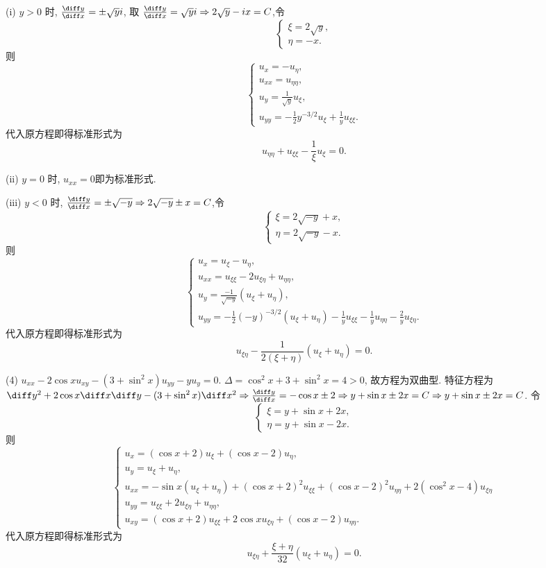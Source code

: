 \begin{solve}
  (i) $y>0$ 时, $\frac{\diff y}{\diff x}=\pm\sqrt{y}i$,
  取 $\frac{\diff y}{\diff x}=\sqrt{y}i\Rightarrow 2\sqrt{y}-ix=C$,令
  \[\begin{cases}
  \xi = 2\sqrt{y}, \\
  \eta=-x.
  \end{cases}\]
  则
  \[\begin{cases}
    u_x = -u_{\eta}, \\
    u_{xx} = u_{\eta\eta}, \\
    u_{y} = \frac{1}{\sqrt{y}}u_{\xi}, \\
    u_{yy} = -\frac{1}{2}y^{-3/2}u_{\xi}+\frac{1}{y}u_{\xi\xi}.
  \end{cases}\]
  代入原方程即得标准形式为
  \[u_{\eta\eta}+u_{\xi\xi}-\frac{1}{\xi}u_{\xi} = 0.\]

  (ii) $y=0$ 时, $u_{xx}=0$即为标准形式.

  (iii) $y<0$ 时, $\frac{\diff y}{\diff x}=\pm\sqrt{-y}\Rightarrow 2\sqrt{-y}\pm x=C$,令
  \[\begin{cases}
  \xi = 2\sqrt{-y}+x, \\
  \eta = 2\sqrt{-y}-x.
  \end{cases}\]
  则
  \[\begin{cases}
    u_x=u_{\xi}-u_{\eta}, \\
    u_{xx}=u_{\xi\xi}-2u_{\xi\eta}+u_{\eta\eta}, \\
    u_{y}=\frac{-1}{\sqrt{-y}}(u_{\xi}+u_{\eta}), \\
    u_{yy}=-\frac{1}{2}(-y)^{-3/2}(u_{\xi}+u_{\eta})-\frac{1}{y}u_{\xi\xi}-\frac{1}{y}u_{\eta\eta}-\frac{2}{y}u_{\xi\eta}.
  \end{cases}\]
  代入原方程即得标准形式为
  \[u_{\xi\eta}-\frac{1}{2(\xi+\eta)}(u_{\xi}+u_{\eta}) = 0.\]

  (4) $u_{xx}-2\cos xu_{xy}-(3+\sin^2x)u_{yy}-yu_y=0$.
  $\Delta=\cos^2x+3+\sin^2x=4>0$, 故方程为双曲型.
  特征方程为 $\diff y^2+2\cos x\diff x\diff y-(3+\sin^2x)\diff x^2\Rightarrow\frac{\diff y}{\diff x}=-\cos x\pm2\Rightarrow y+\sin x\pm2x=C\Rightarrow y+\sin x\pm 2x=C$.
  令
  \[\begin{cases}
  \xi = y+\sin x+2x, \\
  \eta = y+\sin x-2x.
  \end{cases}\]
  则
  \[\begin{cases}
    u_x = (\cos x+2)u_{\xi}+(\cos x-2)u_{\eta}, \\
    u_y = u_{\xi}+u_{\eta}, \\
    u_{xx} = -\sin x(u_{\xi}+u_{\eta}) + (\cos x+2)^2u_{\xi\xi}+(\cos x-2)^2u_{\eta\eta}
      + 2(\cos^2x-4)u_{\xi\eta}\\
    u_{yy} = u_{\xi\xi}+2u_{\xi\eta}+u_{\eta\eta}, \\
    u_{xy} = (\cos x+2)u_{\xi\xi}+2\cos xu_{\xi\eta}+(\cos x-2)u_{\eta\eta}.
  \end{cases}\]
  代入原方程即得标准形式为
  \[u_{\xi\eta}+\frac{\xi+\eta}{32}(u_{\xi}+u_{\eta}) = 0.\]


\end{solve}
